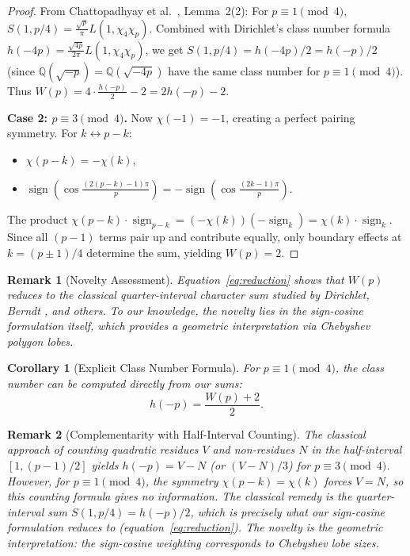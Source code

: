 \documentclass[11pt,a4paper]{article}
\newtheorem{corollary}[theorem]{Corollary}
\newtheorem{remark}{Remark}
\begin{document}
\begin{proof}
From Chattopadhyay et al.\ \cite{CRST2020}, Lemma~2(2): For $p \equiv 1 \pmod 4$, $S(1, p/4) = \frac{\sqrt{p}}{\pi} L(1, \chi_4 \chi_p)$. Combined with Dirichlet's class number formula \cite{IrelandRosen} $h(-4p) = \frac{\sqrt{4p}}{2\pi} L(1, \chi_4 \chi_p)$, we get $S(1, p/4) = h(-4p)/2 = h(-p)/2$ (since $\mathbb{Q}(\sqrt{-p}) = \mathbb{Q}(\sqrt{-4p})$ have the same class number for $p \equiv 1 \pmod 4$). Thus $W(p) = 4 \cdot \frac{h(-p)}{2} - 2 = 2h(-p) - 2$.

\textbf{Case 2: $p \equiv 3 \pmod 4$.} Now $\chi(-1) = -1$, creating a perfect pairing symmetry. For $k \leftrightarrow p-k$:
\begin{itemize}
\item $\chi(p-k) = -\chi(k)$,
\item $\operatorname{sign}\left(\cos\frac{(2(p-k)-1)\pi}{p}\right) = -\operatorname{sign}\left(\cos\frac{(2k-1)\pi}{p}\right)$.
\end{itemize}
The product $\chi(p-k) \cdot \operatorname{sign}_{p-k} = (-\chi(k))(-\operatorname{sign}_k) = \chi(k) \cdot \operatorname{sign}_k$. Since all $(p-1)$ terms pair up and contribute equally, only boundary effects at $k = (p \pm 1)/4$ determine the sum, yielding $W(p) = 2$.
\end{proof}

\begin{remark}[Novelty Assessment]
Equation~\eqref{eq:reduction} shows that $W(p)$ reduces to the classical quarter-interval character sum studied by Dirichlet, Berndt \cite{Berndt1976}, and others. To our knowledge, the novelty lies in the sign-cosine formulation itself, which provides a geometric interpretation via Chebyshev polygon lobes.
\end{remark}

\begin{corollary}[Explicit Class Number Formula]\label{cor:explicit}
For $p \equiv 1 \pmod 4$, the class number can be computed directly from our sums:
\[
h(-p) = \frac{W(p) + 2}{2}.
\]
\end{corollary}

\begin{remark}[Complementarity with Half-Interval Counting]
The classical approach of counting quadratic residues $V$ and non-residues $N$ in the half-interval $[1, (p-1)/2]$ yields $h(-p) = V - N$ (or $(V-N)/3$) for $p \equiv 3 \pmod 4$. However, for $p \equiv 1 \pmod 4$, the symmetry $\chi(p-k) = \chi(k)$ forces $V = N$, so this counting formula gives no information. The classical remedy is the quarter-interval sum $S(1, p/4) = h(-p)/2$, which is precisely what our sign-cosine formulation reduces to (equation~\eqref{eq:reduction}). The novelty is the geometric interpretation: the sign-cosine weighting corresponds to Chebyshev lobe sizes.
\end{remark}
\end{document}
